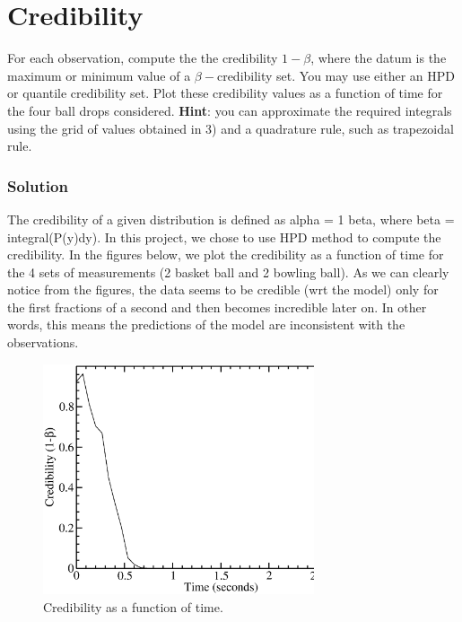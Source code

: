 \documentclass{article}
\begin{document}
\section{Credibility}

For each observation, compute the the credibility $1-\beta$, where
the datum is the maximum or minimum value of a $\beta-$credibility
set. You may use either an HPD or quantile credibility set. Plot these
credibility values as a function of time for the four ball drops considered.
\textbf{Hint}: you can approximate the required integrals using the
grid of values obtained in 3) and a quadrature rule, such as trapezoidal
rule.


\subsubsection*{Solution}

The credibility of a given distribution is defined as alpha = 1 \textendash{}
beta, where beta = integral(P(y)dy). In this project, we chose to
use HPD method to compute the credibility. In the figures below, we
plot the credibility as a function of time for the 4 sets of measurements
(2 basket ball and 2 bowling ball). As we can clearly notice from
the figures, the data seems to be credible (wrt the model) only for
the first fractions of a second and then becomes incredible later on. In other
words, this means the predictions of the model are inconsistent with the
observations. 

\begin{figure}[H]
\begin{centering}
\includegraphics[width=8cm]{figs/credibility} 
\par\end{centering}
\caption{Credibility as a function of time.}

\label{fig:Uc} 
\end{figure}
\end{document}
